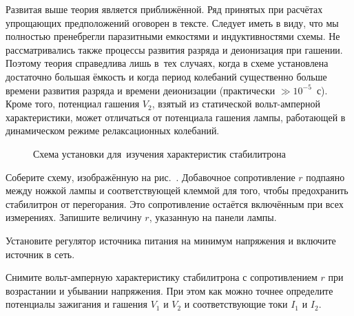 Развитая выше теория является приближённой. Ряд принятых при расчётах упрощающих
предположений оговорен в тексте.
Следует иметь в виду, что мы полностью пренебрегли паразитными емкостями и
индуктивностями схемы. Не рассматривались
также процессы развития разряда и деионизация при гашении. Поэтому теория
справедлива лишь в~тех случаях, когда в схеме
установлена достаточно большая ёмкость и когда период колебаний существенно
больше времени развития разряда и времени
деионизации (практически $\gg10^{-5}$~с). Кроме того, потенциал гашения $V_2$,
взятый из статической вольт-амперной
характеристики, может отличаться от потенциала гашения лампы, работающей в
динамическом режиме релаксационных колебаний.

\begin{lab:task}


\begin{figure}[h!]
	\caption{Схема установки для~изучения характеристик стабилитрона}
\end{figure}

		\item Соберите схему, изображённую на рис.~. Добавочное сопротивление $r$ подпаяно между ножкой лампы и
соответствующей
клеммой для того, чтобы предохранить стабилитрон от перегорания. Это
сопротивление остаётся включённым при всех
измерениях. Запишите величину $r$, указанную на панели лампы.

		\item Установите регулятор источника питания на минимум напряжения и
включите источник в сеть.

		\item Снимите вольт-амперную характеристику стабилитрона с
сопротивлением $r$ при возрастании и убывании напряжения. При
этом как можно точнее определите потенциалы зажигания и гашения $V_1$ и $V_2$ и
соответствующие токи $I_1$ и $I_2$.



\end{lab:task}
